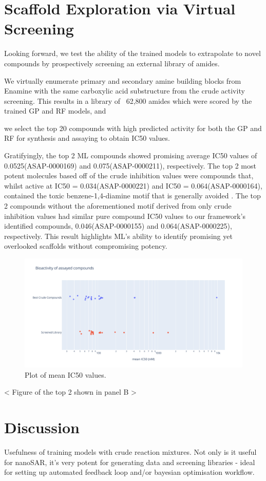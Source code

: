 \section{Scaffold Exploration via Virtual Screening}

Looking forward, we test the ability of the trained models to extrapolate to novel compounds by prospectively screening an external library of amides. 

We virtually enumerate primary and secondary amine building blocks from Enamine with the same carboxylic acid substructure from the crude activity screening. This results in a library of ~62,800 amides which were scored by the trained GP and RF models, and 

we select the top 20 compounds with high predicted activity for both the GP and RF for synthesis and assaying to obtain IC50 values. 

Gratifyingly, the top 2 ML compounds showed promising average IC50 values of 0.0525\uM (ASAP-0000169) and 0.075\uM (ASAP-0000211), respectively. The top 2 most potent molecules based off of the crude inhibition values were compounds that, whilst active at IC50 = 0.034\uM (ASAP-0000221) and IC50 = 0.064\uM (ASAP-0000164), contained the toxic benzene-1,4-diamine motif that is generally avoided \cite{Kumar2011diallinine}. The top 2 compounds without the aforementioned motif derived from only crude inhibition values had similar pure compound IC50 values to our framework's identified compounds, 0.046\uM (ASAP-0000155) and 0.064\uM (ASAP-0000225), respectively. This result highlights ML's ability to identify promising yet overlooked scaffolds without compromising potency. 

\begin{figure}
    \centering
             \includegraphics[width=\textwidth]{Chapters/Crude/Figs/strip_plot.pdf}
        \caption{Plot of mean IC50 values.}
        \label{fig:strip}
    \end{figure}

< Figure of the top 2 shown in panel B >

\section{Discussion}

Usefulness of training models with crude reaction mixtures. Not only is it useful for nanoSAR, it's very potent for generating data and screening libraries - ideal for setting up automated feedback loop and/or bayesian optimisation workflow.